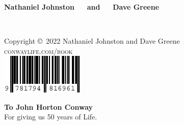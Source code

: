 \documentclass[11pt,twoside]{book}
\begin{document}
\vspace*{5.55in}\textbf{\textsf{{\fontsize{16}{40}\selectfont Nathaniel Johnston} $\quad$ and $\quad$ {\fontsize{16}{40}\selectfont Dave Greene}}}
\vfill
\endgroup
\newpage
\fi


~\vfill
\thispagestyle{empty}

\noindent Copyright \copyright\ 2022 Nathaniel Johnston and Dave Greene\\ %


\noindent \textsc{conwaylife.com/book}\\[0.2cm] %

\noindent \includegraphics[width=4cm]{images/isbn.pdf}



\clearpage

\vspace*{1.5in}
\begin{center}
	\textbf{\large To John Horton Conway}\\For giving us 50 years of Life.
\end{center}






\setcounter{tocdepth}{1}
\pagestyle{empty} %

\tableofcontents %

\cleardoublepage %
\end{document}
